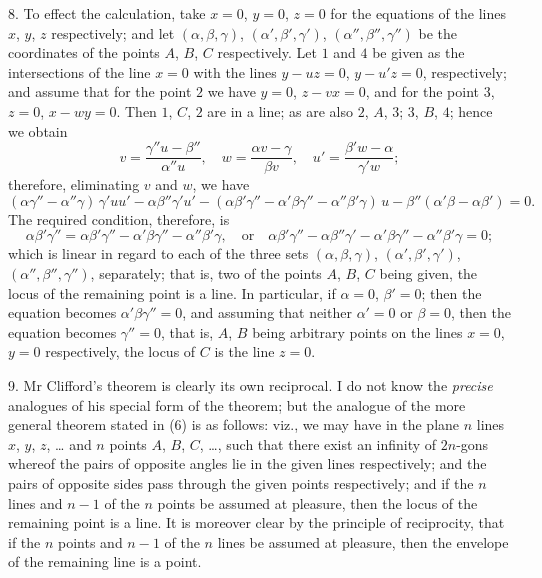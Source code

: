 \documentclass[11pt,a4paper]{article}
\begin{document}
8. To effect the calculation, take $x=0$, $y=0$, $z=0$ for the equations of the lines
$x$, $y$, $z$ respectively; and let $(\alpha, \beta, \gamma)$, $(\alpha', \beta', \gamma')$, $(\alpha'', \beta'', \gamma'')$ be the coordinates of the
points $A$, $B$, $C$ respectively. Let $1$ and $4$ be given as the intersections of the line
$x=0$ with the lines $y-uz=0$, $y-u'z=0$, respectively; and assume that for the point $2$
we have $y=0$, $z-vx=0$, and for the point $3$, $z=0$, $x-wy=0$. Then $1$, $C$, $2$ are in
a line; as are also $2$, $A$, $3$; $3$, $B$, $4$; hence we obtain
\[
v = \frac{\gamma''u - \beta''}{\alpha''u}, \quad w = \frac{\alpha v - \gamma}{\beta v}, \quad u' = \frac{\beta'w - \alpha}{\gamma'w};
\]
therefore, eliminating $v$ and $w$, we have
\[
(\alpha\gamma'' - \alpha''\gamma)\,\gamma'uu' - \alpha\beta''\gamma'u' - (\alpha\beta'\gamma'' - \alpha'\beta\gamma'' - \alpha''\beta'\gamma)\,u - \beta''(\alpha'\beta - \alpha\beta') = 0.
\]
The required condition, therefore, is
\[
\alpha\beta'\gamma'' = \alpha\beta'\gamma'' - \alpha'\beta\gamma'' - \alpha''\beta'\gamma, \quad \text{or}\quad \alpha\beta'\gamma'' - \alpha\beta''\gamma' - \alpha'\beta\gamma'' - \alpha''\beta'\gamma = 0;
\]
which is linear in regard to each of the three sets $(\alpha, \beta, \gamma)$, $(\alpha', \beta', \gamma')$, $(\alpha'', \beta'', \gamma'')$,
separately; that is, two of the points $A$, $B$, $C$ being given, the locus of the remaining
point is a line. In particular, if $\alpha=0$, $\beta'=0$; then the equation becomes $\alpha'\beta\gamma''=0$,
and assuming that neither $\alpha'=0$ or $\beta=0$, then the equation becomes $\gamma''=0$, that is,
$A$, $B$ being arbitrary points on the lines $x=0$, $y=0$ respectively, the locus of $C$ is the
line $z=0$.

9. Mr Clifford's theorem is clearly its own reciprocal. I do not know the \textit{precise}
analogues of his special form of the theorem; but the analogue of the more general
theorem stated in (6) is as follows: viz., we may have in the plane $n$ lines $x$, $y$, $z$, \ldots
and $n$ points $A$, $B$, $C$, \ldots, such that there exist an infinity of $2n$-gons whereof the
pairs of opposite angles lie in the given lines respectively; and the pairs of opposite
sides pass through the given points respectively; and if the $n$ lines and $n-1$ of the
$n$ points be assumed at pleasure, then the locus of the remaining point is a line. It
is moreover clear by the principle of reciprocity, that if the $n$ points and $n-1$ of
the $n$ lines be assumed at pleasure, then the envelope of the remaining line is a
point.
\end{document}
